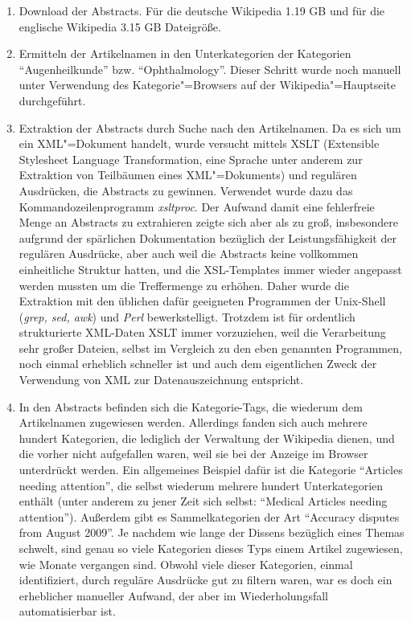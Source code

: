 \documentclass[pagesize,paper=A4,DIV=calc,fontsize=12pt,draft=false]{scrreprt}
\begin{document}
\begin{enumerate}
\item Download der Abstracts. Für die deutsche Wikipedia 1.19 GB und für die englische Wikipedia 3.15 GB Dateigröße.
\item Ermitteln der Artikelnamen in den Unterkategorien der Kategorien \enquote{Augenheilkunde} bzw. \enquote{Ophthalmology}. 
Dieser Schritt wurde noch manuell unter Verwendung des Kategorie"=Browsers auf der Wikipedia"=Hauptseite durchgeführt. 
\item Extraktion der Abstracts durch Suche nach den Artikelnamen. 
Da es sich um ein XML"=Dokument handelt, wurde versucht mittels XSLT (Extensible Stylesheet Language Transformation, eine Sprache unter anderem zur Extraktion von Teilbäumen eines XML"=Dokuments) und regulären Ausdrücken, die Abstracts zu gewinnen. 
Verwendet wurde dazu das Kommandozeilenprogramm \emph{xsltproc}. 
Der Aufwand damit eine fehlerfreie Menge an Abstracts zu extrahieren zeigte sich aber als zu groß, insbesondere aufgrund der spärlichen Dokumentation bezüglich der Leistungsfähigkeit der regulären Ausdrücke, aber auch weil die Abstracts keine vollkommen einheitliche Struktur hatten, und die XSL-Templates immer wieder angepasst werden mussten um die Treffermenge zu erhöhen.
Daher wurde die Extraktion mit den üblichen dafür geeigneten Programmen der Unix-Shell (\emph{grep, sed, awk}) und \emph{Perl} bewerkstelligt. 
Trotzdem ist für ordentlich strukturierte XML-Daten XSLT immer vorzuziehen, weil die Verarbeitung sehr großer Dateien, selbst im Vergleich zu den eben genannten Programmen, noch einmal erheblich schneller ist und auch dem eigentlichen Zweck der Verwendung von XML zur Datenauszeichnung entspricht. 
\item In den Abstracts befinden sich die Kategorie-Tags, die wiederum dem Artikelnamen zugewiesen werden. 
Allerdings fanden sich auch mehrere hundert Kategorien, die lediglich der Verwaltung der Wikipedia dienen, und die vorher nicht aufgefallen waren, weil sie bei der Anzeige im Browser unterdrückt werden. 
Ein allgemeines Beispiel dafür ist die Kategorie \enquote{Articles needing attention}, die selbst wiederum mehrere hundert Unterkategorien enthält (unter anderem zu jener Zeit sich selbst: \enquote{Medical Articles needing attention}). 
Außerdem gibt es Sammelkategorien der Art \enquote{Accuracy disputes from August 2009}. 
Je nachdem wie lange der Dissens bezüglich eines Themas schwelt, sind genau so viele Kategorien dieses Typs einem Artikel zugewiesen, wie Monate vergangen sind. 
Obwohl viele dieser Kategorien, einmal identifiziert, durch reguläre Ausdrücke gut zu filtern waren, war es doch ein erheblicher manueller Aufwand, der aber im Wiederholungsfall automatisierbar ist.
\end{enumerate}
\end{document}
